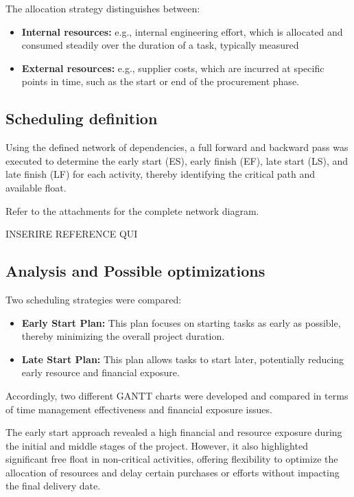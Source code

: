 \documentclass[12pt]{article}
\begin{document}
The allocation strategy distinguishes between:
\begin{itemize}
        \item \textbf{Internal resources:} e.g., internal engineering effort, which is allocated and consumed steadily over the duration of a task, typically measured
        \item \textbf{External resources:} e.g., supplier costs, which are incurred at specific points in time, such as the start or end of the procurement phase.
\end{itemize}

\subsection{Scheduling definition}
Using the defined network of dependencies, a full forward and backward pass was executed to determine the early start (ES), early finish (EF), late start (LS), and late finish (LF) for each activity, thereby identifying the critical path and available float.

Refer to the attachments for the complete network diagram.

INSERIRE REFERENCE QUI

\subsection{Analysis and Possible optimizations}
Two scheduling strategies were compared:
\begin{itemize}
        \item \textbf{Early Start Plan:} This plan focuses on starting tasks as early as possible, thereby minimizing the overall project duration.
        \item \textbf{Late Start Plan:} This plan allows tasks to start later, potentially reducing early resource and financial exposure.
\end{itemize}

Accordingly, two different GANTT charts were developed and compared in terms of time management effectiveness and financial exposure issues.

The early start approach revealed a high financial and resource exposure during the initial and middle stages of the project. However, it also highlighted significant free float in non-critical activities, offering flexibility to optimize the allocation of resources and delay certain purchases or efforts without impacting the final delivery date.
\end{document}
